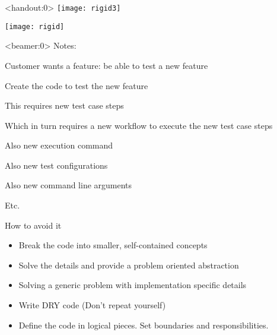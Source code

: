 \documentclass[xcolor=svgnames, handout]{beamer}
\begin{document}
{%
%
\begin{frame}<handout:0>{\subsecname}
    \centering
    \texttt{[image: rigid3]}
\end{frame}
}

{%
%
\begin{frame}{\subsecname}
    \centering
    \texttt{[image: rigid]}
\end{frame}
}

{%
%
\begin{frame}<beamer:0>{\subsecname}
    Notes:\par
    Customer wants a feature: be able to test a new feature\par
    Create the code to test the new feature\par
    This requires new test case steps\par
    Which in turn requires a new workflow to execute the new test case steps\par
    Also new execution command\par
    Also new test configurations\par
    Also new command line arguments\par
    Etc.\par
\end{frame}
}


{%
%
\begin{frame}{\subsecname}

    How to avoid it
    \begin{itemize}
        \pause \item Break the code into smaller, self-contained concepts
        \pause \item Solve the details and provide a problem oriented abstraction
        \pause \item Solving a generic problem with implementation specific details
        \pause \item Write DRY code (Don't repeat yourself)
        \pause \item Define the code in logical pieces.  Set boundaries and
            responsibilities.
    \end{itemize}
\end{frame}
}
\end{document}
